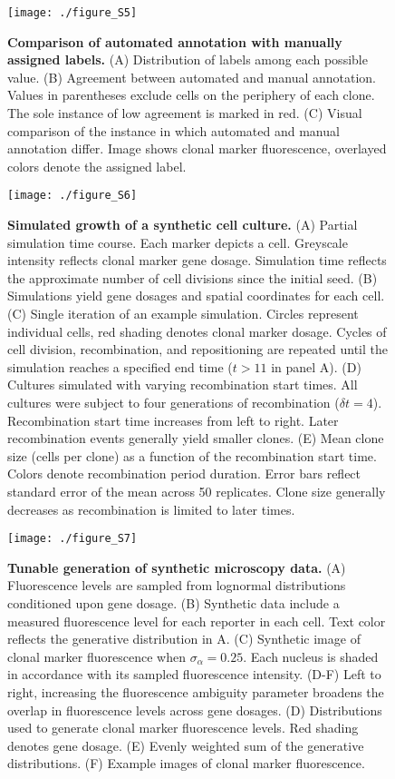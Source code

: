 \begin{figure}[h]
\texttt{[image: ./figure\_S5]}
\caption[Comparison of automated annotation with manually assigned labels.]{\textbf{Comparison of automated annotation with manually assigned labels.} (A) Distribution of labels among each possible value. (B) Agreement between automated and manual annotation. Values in parentheses exclude cells on the periphery of each clone. The sole instance of low agreement is marked in red. (C) Visual comparison of the instance in which automated and manual annotation differ. Image shows clonal marker fluorescence, overlayed colors denote the assigned label.}
\label{fig:clones:figS5}
\end{figure}

\begin{figure}[h]
\texttt{[image: ./figure\_S6]}
\caption[Simulated growth of a synthetic cell culture.]{\textbf{Simulated growth of a synthetic cell culture.} (A) Partial simulation time course. Each marker depicts a cell. Greyscale intensity reflects clonal marker gene dosage. Simulation time reflects the approximate number of cell divisions since the initial seed. (B) Simulations yield gene dosages and spatial coordinates for each cell. (C) Single iteration of an example simulation. Circles represent individual cells, red shading denotes clonal marker dosage. Cycles of cell division, recombination, and repositioning are repeated until the simulation reaches a specified end time ($t>11$ in panel A). (D) Cultures simulated with varying recombination start times. All cultures were subject to four generations of recombination ($\delta t=4$). Recombination start time increases from left to right. Later recombination events generally yield smaller clones. (E) Mean clone size (cells per clone) as a function of the recombination start time. Colors denote recombination period duration. Error bars reflect standard error of the mean across 50 replicates. Clone size generally decreases as recombination is limited to later times.}
\label{fig:clones:figS6}
\end{figure}

\begin{figure}[h]
\texttt{[image: ./figure\_S7]}
\caption[Tunable generation of synthetic microscopy data.]{\textbf{Tunable generation of synthetic microscopy data.} (A) Fluorescence levels are sampled from lognormal distributions conditioned upon gene dosage. (B) Synthetic data include a measured fluorescence level for each reporter in each cell. Text color reflects the generative distribution in A. (C) Synthetic image of clonal marker fluorescence when $\sigma_{\alpha}=0.25$. Each nucleus is shaded in accordance with its sampled fluorescence intensity. (D-F) Left to right, increasing the fluorescence ambiguity parameter broadens the overlap in fluorescence levels across gene dosages. (D) Distributions used to generate clonal marker fluorescence levels. Red shading denotes gene dosage. (E) Evenly weighted sum of the generative distributions. (F) Example images of clonal marker fluorescence.}
\label{fig:clones:figS7}
\end{figure}

